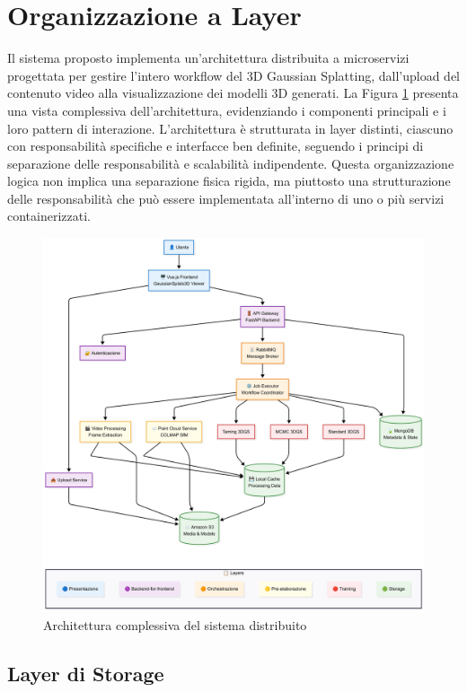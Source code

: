 \section{Organizzazione a Layer}

Il sistema proposto implementa un'architettura distribuita a microservizi progettata per gestire l'intero workflow del 3D Gaussian Splatting, dall'upload del contenuto video alla visualizzazione dei modelli 3D generati. La Figura \ref{fig:system_architecture} presenta una vista complessiva dell'architettura, evidenziando i componenti principali e i loro pattern di interazione.
L'architettura è strutturata in layer distinti, ciascuno con responsabilità specifiche e interfacce ben definite, seguendo i principi di separazione delle responsabilità e scalabilità indipendente. Questa organizzazione logica non implica una separazione fisica rigida, ma piuttosto una strutturazione delle responsabilità che può essere implementata all'interno di uno o più servizi containerizzati.

\begin{figure}[htbp]
	\centering
	\includegraphics[width=\textwidth]{images/diagramma_architettura.jpg}
	\caption{Architettura complessiva del sistema distribuito}
	\label{fig:system_architecture}
\end{figure}


\subsection{Layer di Storage}

